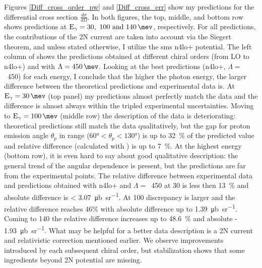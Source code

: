         
    Figures \ref{Diff_cross_order_pw} and \ref{Diff_cross_err} show my predictions 
    for the differential cross section
    $\frac{d\sigma}{d\Omega}$.
    In both figures, the top, middle, and bottom row shows predictions at 
    $\text{E}_\gamma = \SIlist[list-units = single]{30;100;140}{\mev}$, respectively.
    For all predictions, the contributions of the 2N current are taken into account via the Siegert theorem,
    and unless stated otherwise, I utilize the \gls{sms} \gls{n4lo+} potential.
    The left column of  shows the predictions obtained at 
    different chiral orders (from LO to \gls{n4lo+}) and with $\Lambda=\SI{450}{\mev}$.
    Looking at the best predictions (\gls{n4lo+}, $\Lambda=$~\SI{450}{\mev}) for each
    energy, I
    conclude that the higher the photon energy, the larger 
    difference between the theoretical predictions and experimental 
    data is. At $\text{E}_\gamma = \SI{30}{\mev}$ (top panel) my predictions
    almost perfectly match the data and the difference is almost always
    within the tripled experimental uncertainties. 
    Moving to  $\text{E}_\gamma=\SI{100}{\mev}$ (middle row)
    the description of the data is deteriorating: theoretical
    predictions still match the data qualitatively, but
    the gap for proton emission angle $\theta_p$ in range ($\ang{60} < \theta_p < \ang{130}$) 
    is up to \SI{32}{\percent} of the predicted value
    and relative difference (calculated with ) is up to
    \SI{7}{\percent}.
    At the highest energy (bottom row), it is even hard to say about 
    good qualitative description: the general trend of the
    angular dependence is present, but the predictions are 
    far from the experimental points.
    The relative difference between experimental data and predictions obtained with \gls{n4lo+} and $\Lambda=$~\SI{450}{\mev} at \SI{30}{\mev} is less then \SI{13}{\percent}
    and absolute difference is < \SI{3.07}{\micro \barn \per \steradian}.
    At \SI{100}{\mev} discrepancy is larger and the relative difference reaches 46\% with absolute difference up to \SI{1.39}{\micro \barn \per \steradian}.
    Coming to \SI{140}{\mev} the relative difference 
    increases up to \SI{48.6}{\percent} and absolute - \SI{1.93}{\micro \barn \per \steradian}.
    What may be helpful
    for a better data description is a 2N current 
    and relativistic correction mentioned earlier.
    We observe improvements introduced by each subsequent chiral order, but 
    stabilization shows that some ingredients beyond 2N potential are missing.


